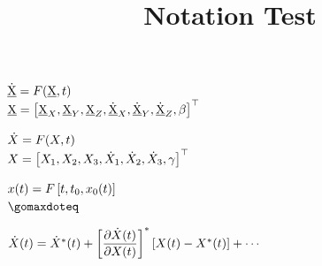 \documentclass{beamer}
\begin{document}
\title{Notation Test}

$\tsbeqmo$\\
$\tsbwhereeqmo$

$\myeqmo$\\ $\mywhereeqmo$

$\gomaeqmo$\\ $\gomaxdoteq$

$\linrefeq{X}$
\end{document}
